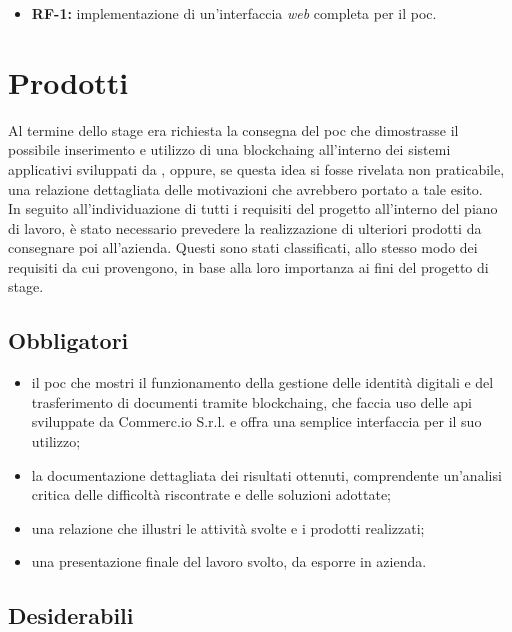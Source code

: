 \begin{itemize}
	\item \textbf{RF-1:} implementazione di un'interfaccia \textit{web} completa per il \gls{poc}.
\end{itemize} 

\section{Prodotti}

Al termine dello stage era richiesta la consegna del \gls{poc} che dimostrasse il possibile inserimento e utilizzo di una \gls{blockchaing} all'interno dei sistemi applicativi sviluppati da \myCompany{} \companyTitle, oppure, se questa idea si fosse rivelata non praticabile, una relazione dettagliata delle motivazioni che avrebbero portato a tale esito.\\
In seguito all'individuazione di tutti i requisiti del progetto all'interno del piano di lavoro, è stato necessario prevedere la realizzazione di ulteriori prodotti da consegnare poi all'azienda. Questi sono stati classificati, allo stesso modo dei requisiti da cui provengono, in base alla loro importanza ai fini del progetto di stage.

\subsection{Obbligatori}
\begin{itemize}
	\item il \gls{poc} che mostri il funzionamento della gestione delle identità digitali e del trasferimento di documenti tramite \gls{blockchaing}, che faccia uso delle \gls{api} sviluppate da Commerc.io S.r.l. e offra una semplice interfaccia per il suo utilizzo;
	\item la documentazione dettagliata dei risultati ottenuti, comprendente un'analisi critica delle difficoltà riscontrate e delle soluzioni adottate;
	\item una relazione che illustri le attività svolte e i prodotti realizzati;
	\item una presentazione finale del lavoro svolto, da esporre in azienda.
\end{itemize}

\subsection{Desiderabili}

